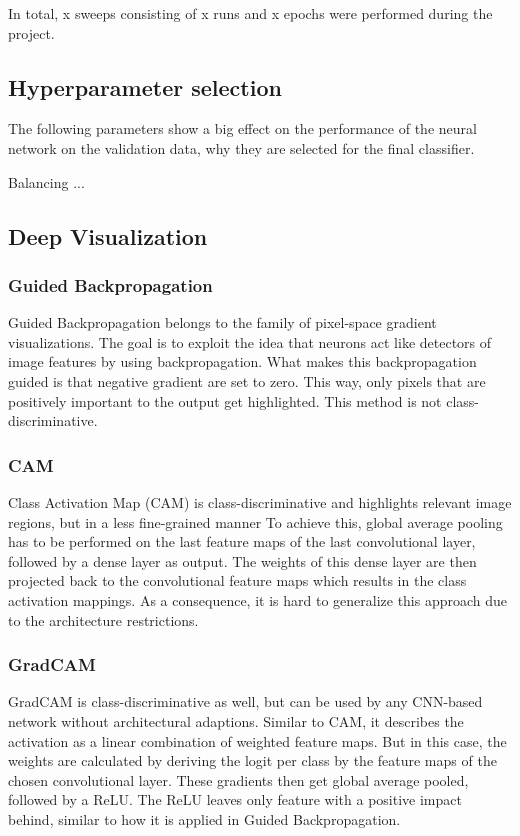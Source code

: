 \documentclass{article}
\begin{document}
In total, x sweeps consisting of x runs and x epochs were performed during the project.

\subsection{Hyperparameter selection}
The following parameters show a big effect on the performance of the neural network on the validation data, 
why they are selected for the final classifier.

Balancing
...
\subsection{Deep Visualization}
\subsubsection{Guided Backpropagation}
Guided Backpropagation belongs to the family of pixel-space gradient visualizations. 
The goal is to exploit the idea that neurons act like detectors of image features by using backpropagation.
What makes this backpropagation guided is that negative gradient are set to zero. This way, only pixels that are positively important to 
the output get highlighted. This method is not class-discriminative.  
\subsubsection{CAM}
Class Activation Map (CAM) is class-discriminative and highlights relevant image regions, but in a less fine-grained manner
To achieve this, global average pooling has to be performed on the last feature maps of the last convolutional layer, followed by a dense layer as output.
The weights of this dense layer are then projected back to the convolutional feature maps which results in the class activation mappings.
As a consequence, it is hard to generalize this approach due to the architecture restrictions.
\subsubsection{GradCAM}
GradCAM is class-discriminative as well, but can be used by any CNN-based network without architectural adaptions.
Similar to CAM, it describes the activation as a linear combination of weighted feature maps. But in this case, the weights are calculated
by deriving the logit per class by the feature maps of the chosen convolutional layer. These gradients then get global average pooled, followed by a ReLU.
The ReLU leaves only feature with a positive impact behind, similar to how it is applied in Guided Backpropagation.
\end{document}
